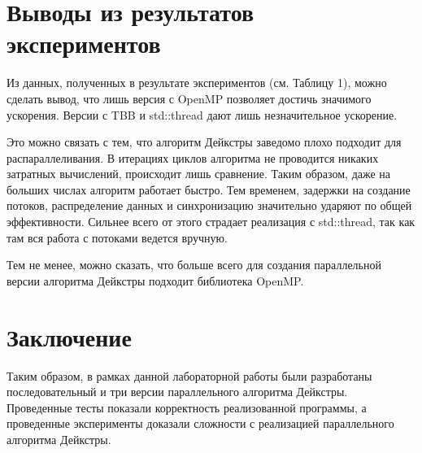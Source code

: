 \documentclass{report}
\begin{document}
\newpage

\section*{Выводы из результатов экспериментов}
Из данных, полученных в результате экспериментов (см. Таблицу 1), можно сделать вывод, что лишь версия с OpenMP позволяет достичь значимого ускорения. Версии с TBB и std::thread дают лишь незначительное ускорение.
\par Это можно связать с тем, что алгоритм Дейкстры заведомо плохо подходит для распараллеливания. В итерациях циклов алгоритма не проводится никаких затратных вычислений, происходит лишь сравнение. Таким образом, даже на больших числах алгоритм работает быстро. Тем временем, задержки на создание потоков, распределение данных и синхронизацию значительно ударяют по общей эффективности. Сильнее всего от этого страдает реализация с std::thread, так как там вся работа с потоками ведется вручную.
\par Тем не менее, можно сказать, что больше всего для создания параллельной версии алгоритма Дейкстры подходит библиотека OpenMP.
\newpage

\section*{Заключение}
Таким образом, в рамках данной лабораторной работы были разработаны последовательный и три версии параллельного алгоритма Дейкстры. Проведенные тесты показали корректность реализованной программы, а проведенные эксперименты доказали сложности с реализацией параллельного алгоритма Дейкстры.
\newpage

\end{document}
